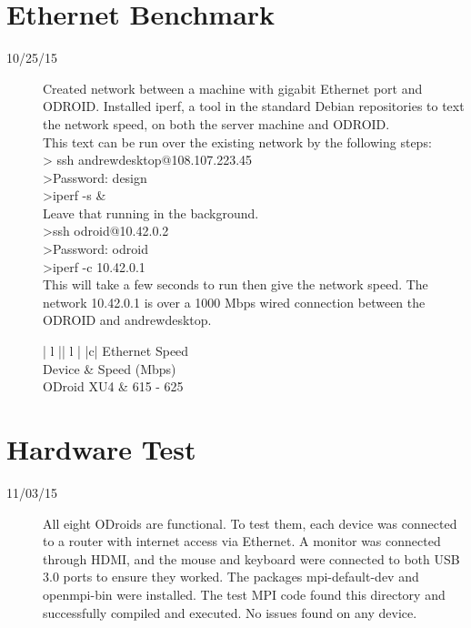 \section{Ethernet Benchmark}
\begin{description}
\item [10/25/15] Created network between a machine with gigabit Ethernet port and ODROID. Installed iperf, a tool in the standard Debian repositories to text the network speed, on both the server machine and ODROID. \\

This text can be run over the existing network by the following steps: \\
> ssh andrewdesktop@108.107.223.45 \\
>Password: design \\
>iperf -s \& \\
Leave that running in the background. \\
>ssh odroid@10.42.0.2 \\
>Password: odroid \\
>iperf -c 10.42.0.1 \\
This will take a few seconds to run then give the network speed. The network 10.42.0.1 is over a 1000 Mbps wired connection between the ODROID and andrewdesktop. \\

\begin{center}
\begin{tabular}{ | l || l | }
\hline
{}
{ |c| }{ Ethernet Speed } \\
\hline
Device & Speed (Mbps) \\
\hline
ODroid XU4 & 615 - 625 \\
\hline
\end{tabular}
\end{center}

\end{description}

\section{Hardware Test}
\begin{description}
\item [11/03/15] All eight ODroids are functional. To test them, each device was connected to a router with internet access via Ethernet. A monitor was connected through HDMI, and the mouse and keyboard were connected to both USB 3.0 ports to ensure they worked. The packages mpi-default-dev and openmpi-bin were installed. The test MPI code found this directory and successfully compiled and executed. No issues found on any device. \\
\end{description}

